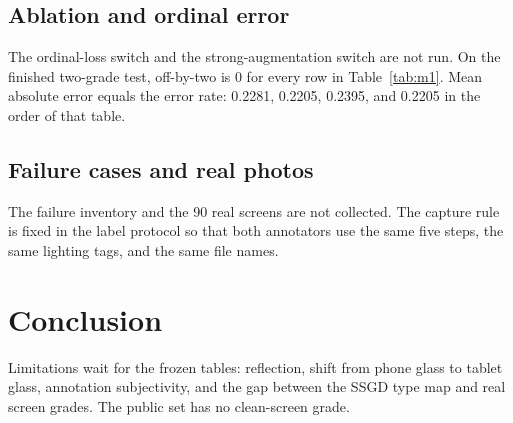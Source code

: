 \documentclass[10pt]{article}
\begin{document}
\subsection{Ablation and ordinal error}
The ordinal-loss switch and the strong-augmentation switch are not run. On the finished two-grade test, off-by-two is 0 for every row in Table~\ref{tab:m1}. Mean absolute error equals the error rate: 0.2281, 0.2205, 0.2395, and 0.2205 in the order of that table.

\subsection{Failure cases and real photos}
The failure inventory and the 90 real screens are not collected. The capture rule is fixed in the label protocol so that both annotators use the same five steps, the same lighting tags, and the same file names.

\section{Conclusion}
Limitations wait for the frozen tables: reflection, shift from phone glass to tablet glass, annotation subjectivity, and the gap between the SSGD type map and real screen grades. The public set has no clean-screen grade.
\end{document}
